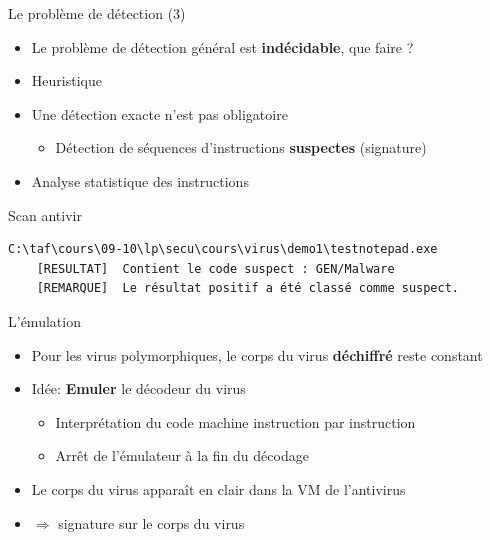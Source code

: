 \documentclass{beamer}
\begin{document}
\begin{frame}[fragile]{Le problème de détection (3)}
\begin{itemize}
\item Le problème de détection général est \textbf{indécidable}, que faire ?
\item Heuristique
\item Une détection exacte n'est pas obligatoire
\begin{itemize}
\item Détection de séquences d'instructions \textbf{suspectes} (signature)
\end{itemize}
\item Analyse statistique des instructions
\end{itemize}
\begin{exampleblock}{Scan antivir}
\tiny{
\begin{verbatim}
C:\taf\cours\09-10\lp\secu\cours\virus\demo1\testnotepad.exe
    [RESULTAT]  Contient le code suspect : GEN/Malware
    [REMARQUE]  Le résultat positif a été classé comme suspect.
\end{verbatim}}
\end{exampleblock}
\end{frame}

\begin{frame}{L'émulation}
\begin{itemize}
\item Pour les virus polymorphiques, le corps du virus \textbf{déchiffré} reste constant
\item Idée: \textbf{Emuler} le décodeur du virus 
\begin{itemize}
\item Interprétation du code machine instruction par instruction
\item Arrêt de l'émulateur à la fin du décodage
\end{itemize}
\item Le corps du virus apparaît en clair dans la VM de l'antivirus
\item $\Rightarrow$ signature sur le corps du virus
\end{itemize}
\end{frame}
\end{document}
